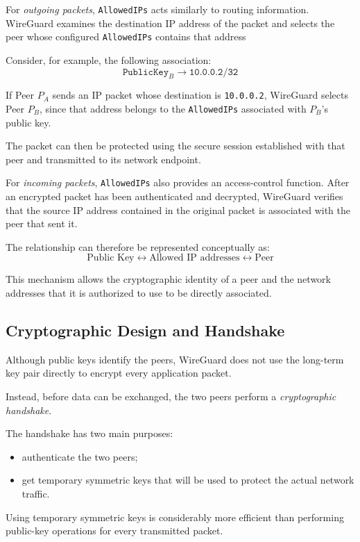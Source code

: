 For \textit{outgoing packets}, \texttt{AllowedIPs} acts similarly to routing information. WireGuard examines the destination IP address of the packet and selects the peer whose configured \texttt{AllowedIPs} contains that address

Consider, for example, the following association:
\[
	\texttt{PublicKey}_{B}
	\longrightarrow
	\texttt{10.0.0.2/32}
\]

If Peer \(P_A\) sends an IP packet whose destination is \texttt{10.0.0.2}, WireGuard selects Peer \(P_B\), since that address belongs to the \texttt{AllowedIPs} associated with \(P_B\)'s public key.

The packet can then be protected using the secure session established with that peer and transmitted to its network endpoint.

For \textit{incoming packets}, \texttt{AllowedIPs} also provides an access-control function. After an encrypted packet has been authenticated and decrypted, WireGuard verifies that the source IP address contained in the original packet is associated with the peer that sent it.

The relationship can therefore be represented conceptually as: \[
	\text{Public Key}
	\longleftrightarrow
	\text{Allowed IP addresses}
	\longleftrightarrow
	\text{Peer}
\]

This mechanism allows the cryptographic identity of a peer and the network addresses that it is authorized to use to be directly associated.

\subsection{Cryptographic Design and Handshake}

Although public keys identify the peers, WireGuard does not use the long-term key pair directly to encrypt every application packet.

Instead, before data can be exchanged, the two peers perform a \textit{cryptographic handshake}.

The handshake has two main purposes:
\begin{itemize}
	\item authenticate the two peers;
	\item get temporary symmetric keys that will be used to protect the actual network traffic.
\end{itemize}

Using temporary symmetric keys is considerably more efficient than performing public-key operations for every transmitted packet.

